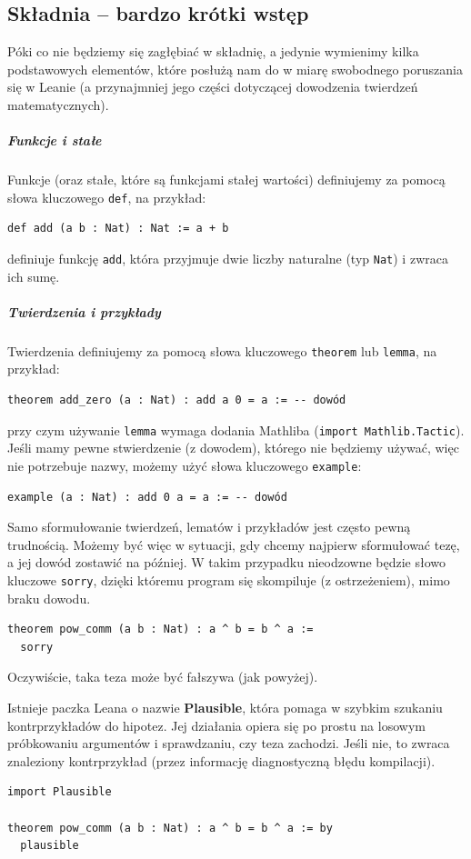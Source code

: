 \documentclass[polish,pretty,bibliography=totocnumbered]{angav}
\newcommand{\Lean}[1]{\texttt{#1}}
\begin{document}
\subsection{Składnia -- bardzo krótki wstęp}

Póki co nie będziemy się zagłębiać w składnię, a jedynie wymienimy kilka podstawowych elementów, które posłużą nam do w miarę swobodnego poruszania się w Leanie (a przynajmniej jego części dotyczącej dowodzenia twierdzeń matematycznych).

\subparagraph{Funkcje i stałe}
Funkcje (oraz stałe, które są funkcjami stałej wartości) definiujemy za pomocą słowa kluczowego \Lean{def}, na przykład:
\begin{verbatim}
def add (a b : Nat) : Nat := a + b
\end{verbatim}
definiuje funkcję \Lean{add}, która przyjmuje dwie liczby naturalne (typ \Lean{Nat}) i zwraca ich sumę.

\subparagraph{Twierdzenia i przykłady}
Twierdzenia definiujemy za pomocą słowa kluczowego \Lean{theorem} lub \Lean{lemma}, na przykład:
\begin{verbatim}
theorem add_zero (a : Nat) : add a 0 = a := -- dowód
\end{verbatim}
przy czym używanie \Lean{lemma} wymaga dodania Mathliba (\Lean{import Mathlib.Tactic}).
Jeśli mamy pewne stwierdzenie (z dowodem), którego nie będziemy używać, więc nie potrzebuje nazwy, możemy użyć słowa kluczowego \Lean{example}:
\begin{verbatim}
example (a : Nat) : add 0 a = a := -- dowód
\end{verbatim}
Samo sformułowanie twierdzeń, lematów i przykładów jest często pewną trudnością. Możemy być więc w sytuacji, gdy chcemy najpierw sformułować tezę, a jej dowód zostawić na później.
W takim przypadku nieodzowne będzie słowo kluczowe \Lean{sorry}, dzięki któremu program się skompiluje (z ostrzeżeniem), mimo braku dowodu.
\begin{verbatim}
theorem pow_comm (a b : Nat) : a ^ b = b ^ a :=
  sorry
\end{verbatim}
Oczywiście, taka teza może być fałszywa (jak powyżej).

\begin{remark}[Plausible]
    Istnieje paczka Leana o nazwie \textbf{Plausible}, która pomaga w szybkim szukaniu kontrprzykładów do hipotez. Jej działania opiera się po prostu na losowym próbkowaniu argumentów i sprawdzaniu, czy teza zachodzi. Jeśli nie, to zwraca znaleziony kontrprzykład (przez informację diagnostyczną błędu kompilacji).
    \begin{verbatim}
import Plausible

theorem pow_comm (a b : Nat) : a ^ b = b ^ a := by
  plausible
    \end{verbatim}
\end{remark}
\end{document}
